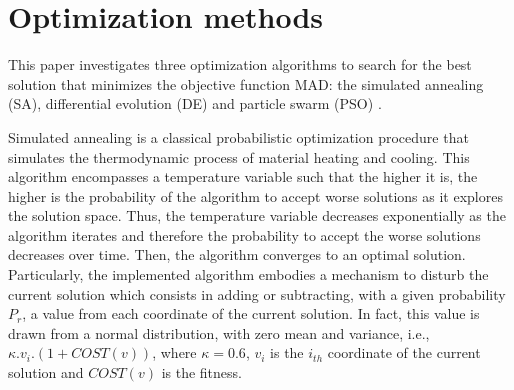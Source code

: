 \section{Optimization methods}

This paper investigates three optimization algorithms to search for the best solution that minimizes the objective function MAD: the simulated annealing (SA), differential evolution (DE) \cite{Storn:1007} and particle swarm (PSO) \cite{Yuhui:1998}. 

Simulated annealing is a classical probabilistic optimization procedure that simulates the thermodynamic process of material heating and cooling. This algorithm encompasses a temperature variable such that the higher it is, the higher is the probability of the algorithm to accept worse solutions as it explores the solution space. Thus, the temperature variable decreases exponentially as the algorithm iterates and therefore the probability to accept the worse solutions decreases over time. Then, the algorithm converges to an optimal solution. Particularly, the implemented algorithm embodies a mechanism to disturb the current solution which consists in adding or subtracting,  with a given probability $P_r$, a value from each coordinate of the current solution. In fact, this value is drawn from a normal distribution, with zero mean and variance, i.e., $\kappa.v_i.(1+COST(v))$, where $\kappa = 0.6$, $v_i$ is the $i_{th}$ coordinate of the current solution and $COST(v)$ is the fitness. 

\begin{comment}
\begin{algorithm}[ht]
\caption{Simulated Annealing}
\label{alg:sa}
\begin{algorithmic}
\Require $N\text{,}\:M\text{,}\:T_0\text{,}\:P\text{,}\:L> 0$, $:\alpha\text{,}\:\kappa\text{,}\:P_r \in [0,1]$, $\:COST$.
\Ensure The best found solution that minimizes $COST$.

\Function{DISTURB}{$\boldsymbol{v}$}
\State $f \gets$ \Call{$COST$}{$\boldsymbol{v}$}
\For{$i = 0,\:1,\:\cdots,\:M-1$} 
\If {$P_r > U(0,1)$}
\State $aux \gets v[i]$
\State $v[i] \gets v[i]+ \kappa.(1+f).\mathcal{N}(0,1).v[i]$
\If {$v[i] \notin [0.125,125.5]$}
\State $v[i] \gets aux$
\EndIf
\EndIf
\EndFor
\State \Return $\boldsymbol{v}$
\EndFunction

\State $i \gets 1$, $n \gets 0$,$T \gets T_0$
\For{$j = 0,\:1,\:\cdots,\:M-1$} 
\State $s[j] \gets U(0.125,125.5)$
\EndFor
\State $fit \gets$ \Call{$COST$}{$\boldsymbol{s}$} 
\Repeat
\State $\boldsymbol{s_d} \gets$ \Call{$Disturb$}{$\boldsymbol{s}$}
\State $\delta \gets$ \Call{$COST$}{$\boldsymbol{s_d}$}$- fit$ 
\If {$\delta < 0$ or $\exp{(\frac{\delta}{T})} > U(0,1)$}
\State $\boldsymbol{s} \gets \boldsymbol{s_d}$,$fit \gets $ \Call{$COST$}{$\boldsymbol{s_d}$}
$n \gets n + 1$
\EndIf
\State $i \gets i + 1$
\Until{$i > P$ or $n > L$}
\State $T \gets \alpha.T$
\end{algorithmic}
\end{algorithm}
\end{comment}

